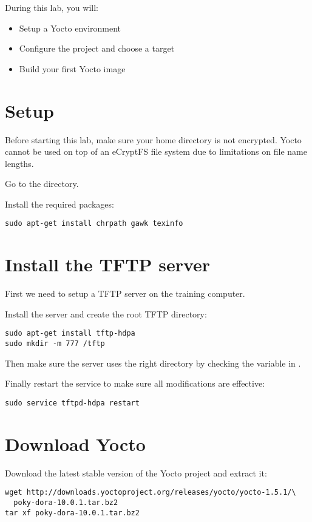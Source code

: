 
During this lab, you will:
\begin{itemize}
  \item Setup a Yocto environment
  \item Configure the project and choose a target
  \item Build your first Yocto image
\end{itemize}

\section{Setup}

Before starting this lab, make sure your home directory is not encrypted. Yocto
cannot be used on top of an eCryptFS file system due to limitations on file name
lengths.

Go to the  directory.

Install the required packages:
\begin{verbatim}
sudo apt-get install chrpath gawk texinfo
\end{verbatim}

\section{Install the TFTP server}

First we need to setup a TFTP server on the training computer.

Install the  server and create the root TFTP directory:
\begin{verbatim}
sudo apt-get install tftp-hdpa
sudo mkdir -m 777 /tftp
\end{verbatim}

Then make sure the  server uses the right directory by checking
the  variable in .

Finally restart the service to make sure all modifications are effective:
\begin{verbatim}
sudo service tftpd-hdpa restart
\end{verbatim}

\section{Download Yocto}

Download the latest stable version of the Yocto project and extract it:
\begin{verbatim}
wget http://downloads.yoctoproject.org/releases/yocto/yocto-1.5.1/\
  poky-dora-10.0.1.tar.bz2
tar xf poky-dora-10.0.1.tar.bz2
\end{verbatim}

